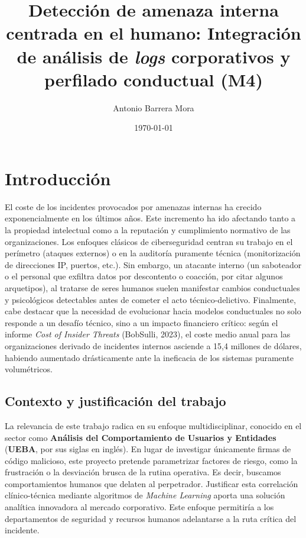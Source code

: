 \documentclass[IB]{TFUOC}%
\title{Detección de amenaza interna centrada en el humano: Integración de análisis de \textit{logs} corporativos y perfilado conductual (M4)}
\author{Antonio Barrera Mora}
\date{\today}
\begin{document}
\estructura

\tableofcontents

\listoffigures

\listoftables




\chapter{Introducción}

El coste de los incidentes provocados por amenazas internas ha crecido exponencialmente en los últimos años. Este incremento ha ido afectando tanto a la propiedad intelectual como a la reputación y cumplimiento normativo de las organizaciones. Los enfoques clásicos de ciberseguridad centran su trabajo en el perímetro (ataques externos) o en la auditoría puramente técnica (monitorización de direcciones IP, puertos, etc.). Sin embargo, un atacante interno (un saboteador o el personal que exfiltra datos por descontento o coacción, por citar algunos arquetipos), al tratarse de seres humanos suelen manifestar cambios conductuales y psicológicos detectables antes de cometer el acto técnico-delictivo.
Finalmente, cabe destacar que la necesidad de evolucionar hacia modelos conductuales no solo responde a un desafío técnico, sino a un impacto financiero crítico: según el informe \textit{Cost of Insider Threats} (BobSulli, 2023), el coste medio anual para las organizaciones derivado de incidentes internos asciende a 15,4 millones de dólares, habiendo aumentado drásticamente ante la ineficacia de los sistemas puramente volumétricos.

\section{Contexto y justificación del trabajo}

La relevancia de este trabajo radica en su enfoque multidisciplinar, conocido en el sector como \textbf{Análisis del Comportamiento de Usuarios y Entidades} (\textbf{UEBA}, por sus siglas en inglés). En lugar de investigar únicamente firmas de código malicioso, este proyecto pretende parametrizar factores de riesgo, como la frustración o la desviación brusca de la rutina operativa. Es decir, buscamos comportamientos humanos que delaten al perpetrador. Justificar esta correlación clínico-técnica mediante algoritmos de \textit{Machine Learning} aporta una solución analítica innovadora al mercado corporativo. Este enfoque permitiría a los departamentos de seguridad y recursos humanos adelantarse a la ruta crítica del incidente.
\end{document}

